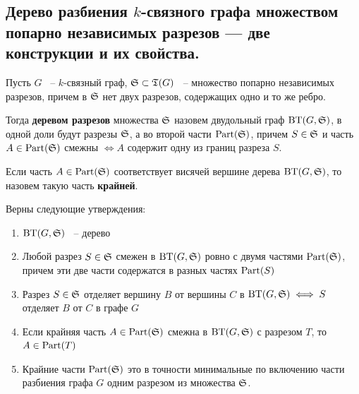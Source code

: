 \subsection{Дерево разбиения $k$-связного графа множеством попарно независимых разрезов — две конструкции и их свойства.}

\begin{df*}
	Пусть $G$ ~--  $k$-связный граф, $\S \subset \T(G)$ ~-- множество попарно независимых разрезов, причем в $\S$ нет двух разрезов, содержащих одно и то же ребро.

	Тогда \textbf{деревом разрезов} множества $\S$ назовем двудольный граф $\BT(G, \S)$, в одной доли будут разрезы  $\S$, а во второй части  $\Part(\S)$, причем $S \in \S$ и часть  $A \in \Part(\S)$ смежны $\iff A$ содержит одну из границ разреза $S$. 
\end{df*}

\begin{df*}
	Если часть $A \in \Part(\S)$ соответствует висячей вершине дерева  $\BT(G, \S)$, то назовем такую часть \textbf{крайней}.
\end{df*}

\begin{customthm}{1.2} \label{theorem:1_2}
	Верны следующие утверждения:

	\begin{enumerate}
		\item $\BT(G, \S)$ ~-- дерево 
		\item Любой разрез  $S \in \S$ смежен в  $\BT(G, \S)$ ровно с двумя частями  $\Part(\S)$, причем эти две части содержатся в разных частях  $\Part(S)$
		\item Разрез  $S \in \S$ отделяет вершину  $B$ от вершины  $C$ в  $\BT(G, \S) \iff S$ отделяет  $B$ от  $C$ в графе  $G$
		\item Если крайняя часть  $A \in \Part(\S)$ смежна в  $\BT(G, \S)$ с разрезом  $T$, то  $A \in \Part(T)$
		\item Крайние части  $\Part(\S)$ это в точности минимальные по включению части разбиения графа  $G$ одним разрезом из множества  $\S$.
	\end{enumerate}

\end{customthm}


